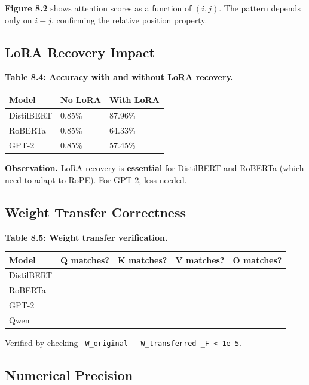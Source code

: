 {\textbf{Figure 8.2} shows attention scores as a function of $(i, j)$. The 
pattern depends only on $i - j$, confirming the relative position 
property.

\subsection{LoRA Recovery Impact}

\textbf{Table 8.4: Accuracy with and without LoRA recovery.}

\begin{table}[H]
\centering
\small
\begin{tabular}{lll}
\toprule
\textbf{Model} & \textbf{No LoRA} & \textbf{With LoRA} \\
\midrule
DistilBERT & 0.85\% & 87.96\% \\
RoBERTa & 0.85\% & 64.33\% \\
GPT-2 & 0.85\% & 57.45\% \\
\bottomrule
\end{tabular}
\end{table}

\textbf{Observation.} LoRA recovery is \textbf{essential} for DistilBERT and 
RoBERTa (which need to adapt to RoPE). For GPT-2, less needed.

\subsection{Weight Transfer Correctness}

\textbf{Table 8.5: Weight transfer verification.}

\begin{table}[H]
\centering
\small
\begin{tabular}{lllll}
\toprule
\textbf{Model} & \textbf{Q matches?} & \textbf{K matches?} & \textbf{V matches?} & \textbf{O matches?} \\
\midrule
DistilBERT &  &  &  &  \\
RoBERTa &  &  &  &  \\
GPT-2 &  &  &  &  \\
Qwen &  &  &  &  \\
\bottomrule
\end{tabular}
\end{table}

Verified by checking \texttt{ W\_original - W\_transferred \_F < 1e-5}.

\subsection{Numerical Precision}

}
